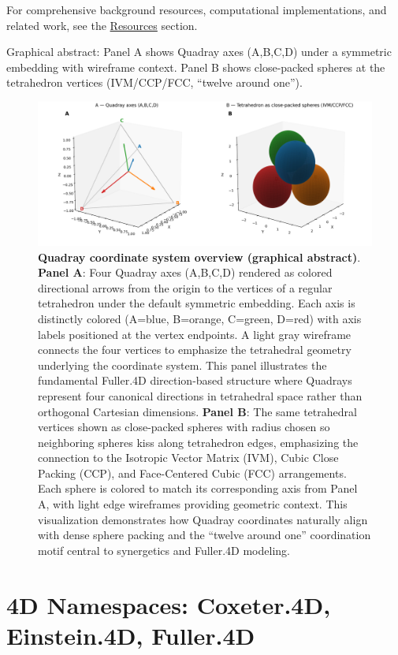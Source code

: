 \documentclass[
  10pt,
]{article}
\begin{document}
For comprehensive background resources, computational implementations,
and related work, see the \href{07_resources.md}{Resources} section.

Graphical abstract: Panel A shows Quadray axes (A,B,C,D) under a
symmetric embedding with wireframe context. Panel B shows close-packed
spheres at the tetrahedron vertices (IVM/CCP/FCC, ``twelve around
one'').

\begin{figure}
\centering
\includegraphics{../output/figures/graphical_abstract_quadray.png}
\caption{\textbf{Quadray coordinate system overview (graphical
abstract)}. \textbf{Panel A}: Four Quadray axes (A,B,C,D) rendered as
colored directional arrows from the origin to the vertices of a regular
tetrahedron under the default symmetric embedding. Each axis is
distinctly colored (A=blue, B=orange, C=green, D=red) with axis labels
positioned at the vertex endpoints. A light gray wireframe connects the
four vertices to emphasize the tetrahedral geometry underlying the
coordinate system. This panel illustrates the fundamental Fuller.4D
direction-based structure where Quadrays represent four canonical
directions in tetrahedral space rather than orthogonal Cartesian
dimensions. \textbf{Panel B}: The same tetrahedral vertices shown as
close-packed spheres with radius chosen so neighboring spheres kiss
along tetrahedron edges, emphasizing the connection to the Isotropic
Vector Matrix (IVM), Cubic Close Packing (CCP), and Face-Centered Cubic
(FCC) arrangements. Each sphere is colored to match its corresponding
axis from Panel A, with light edge wireframes providing geometric
context. This visualization demonstrates how Quadray coordinates
naturally align with dense sphere packing and the ``twelve around one''
coordination motif central to synergetics and Fuller.4D modeling.}
\end{figure}

\newpage

\hypertarget{d-namespaces-coxeter.4d-einstein.4d-fuller.4d}{%
\section{4D Namespaces: Coxeter.4D, Einstein.4D,
Fuller.4D}\label{d-namespaces-coxeter.4d-einstein.4d-fuller.4d}}
\end{document}
